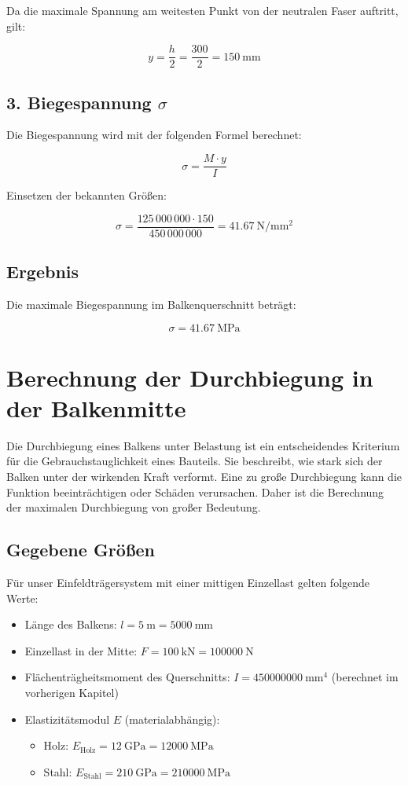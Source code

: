 Da die maximale Spannung am weitesten Punkt von der neutralen Faser auftritt, gilt:

\[
y = \frac{h}{2} = \frac{300}{2} = \SI{150}{\milli\meter}
\]

\subsection*{3. Biegespannung $\sigma$}

Die Biegespannung wird mit der folgenden Formel berechnet:

\[
\sigma = \frac{M \cdot y}{I}
\]

Einsetzen der bekannten Größen:

\[
\sigma = \frac{125\,000\,000 \cdot 150}{450\,000\,000} = \SI{41.67}{\newton\per\milli\meter\squared}
\]

\subsection*{Ergebnis}

Die maximale Biegespannung im Balkenquerschnitt beträgt:

\[
\boxed{\sigma = \SI{41.67}{\mega\pascal}}
\]


\section*{Berechnung der Durchbiegung in der Balkenmitte}

Die Durchbiegung eines Balkens unter Belastung ist ein entscheidendes Kriterium für die Gebrauchstauglichkeit eines Bauteils. Sie beschreibt, wie stark sich der Balken unter der wirkenden Kraft verformt. Eine zu große Durchbiegung kann die Funktion beeinträchtigen oder Schäden verursachen. Daher ist die Berechnung der maximalen Durchbiegung von großer Bedeutung.

\subsection*{Gegebene Größen}

Für unser Einfeldträgersystem mit einer mittigen Einzellast gelten folgende Werte:

\begin{itemize}
  \item Länge des Balkens: \( l = \SI{5}{\meter} = \SI{5000}{\milli\meter} \)
  \item Einzellast in der Mitte: \( F = \SI{100}{\kilo\newton} = \SI{100000}{\newton} \)
  \item Flächenträgheitsmoment des Querschnitts: \( I = \SI{450000000}{\milli\meter^4} \) (berechnet im vorherigen Kapitel)
  \item Elastizitätsmodul \( E \) (materialabhängig):
  \begin{itemize}
    \item Holz: \( E_{\text{Holz}} = \SI{12}{\giga\pascal} = \SI{12000}{\mega\pascal} \)
    \item Stahl: \( E_{\text{Stahl}} = \SI{210}{\giga\pascal} = \SI{210000}{\mega\pascal} \)
  \end{itemize}
\end{itemize}

